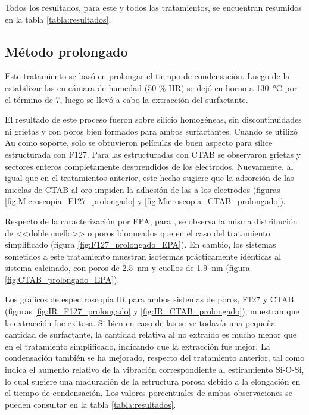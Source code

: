 			 Todos los resultados, para este y todos los tratamientos, se encuentran resumidos en la tabla \ref{tabla:resultados}.

	 \subsection{Método prolongado}

	 	 Este tratamiento se basó en prolongar el tiempo de condensación. Luego de la estabilizar las \pdm\space en cámara de humedad (50 \% HR) se dejó en horno a \SI{130}{\celsius} por el término de 7, luego se llevó a cabo la extracción del surfactante.

	 	 El resultado de este proceso fueron \pdm sobre silicio homogéneas, sin discontinuidades ni grietas y con poros bien formados para ambos surfactantes. Cuando se utilizó Au como soporte, solo se obtuvieron películas de buen aspecto para sílice estructurada con F127. Para las estructuradas con CTAB se observaron grietas y sectores enteros completamente desprendidos de los electrodos. Nuevamente, al igual que en el tratamientos anterior, este hecho sugiere que la adsorción de las micelas de CTAB al oro impiden la adhesión de las \pdmC\space a los electrodos (figuras \ref{fig:Microscopia_F127_prolongado} y \ref{fig:Microscopia_CTAB_prolongado}).

	 	 Respecto de la caracterización por EPA, para \pdmF, se observa la misma distribución de <<doble cuello>> o poros bloqueados que en el caso del tratamiento simplificado (figura \ref{fig:F127_prolongado_EPA}). En cambio, los sistemas \pdmC\space sometidos a este tratamiento muestran isotermas prácticamente idénticas al sistema calcinado, con poros de \SI{2,5}{nm} y cuellos de \SI{1,9}{nm} (figura \ref{fig:CTAB_prolongado_EPA}).

	 	 Los gráficos de espectroscopia IR para ambos sistemas de poros, F127 y CTAB (figuras \ref{fig:IR_F127_prolongado} y \ref{fig:IR_CTAB_prolongado}), muestran que la extracción fue exitosa. Si bien en caso de las \pdmC\space se ve todavía una pequeña cantidad de surfactante, la cantidad relativa al no extraído es mucho menor que en el tratamiento simplificado, indicando que la extracción fue mejor. La condensación también se ha mejorado, respecto del tratamiento anterior, tal como indica el aumento relativo de la vibración correspondiente al estiramiento Si-O-Si, lo cual sugiere una maduración de la estructura porosa debido a la elongación en el tiempo de condensación. Los valores porcentuales de ambas observaciones se pueden consultar en la tabla \ref{tabla:resultados}.

